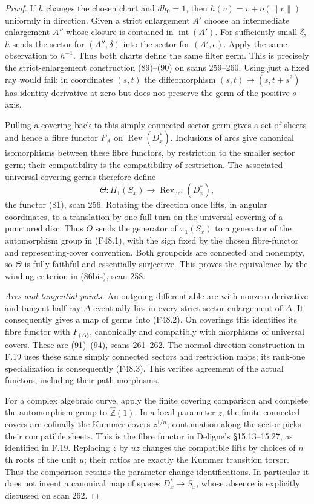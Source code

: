 \begin{proof}
If $h$ changes the chosen chart and $d h_0=1$, then
$h(v)=v+o(\lVert v\rVert)$ uniformly in direction. Given a strict
enlargement $A'$ choose an intermediate enlargement $A''$ whose closure
is contained in $\operatorname{int}(A')$. For sufficiently small $\delta$,
$h$ sends the sector for $(A'',\delta)$ into the sector for
$(A',\epsilon)$. Apply the same observation to $h^{-1}$.
Thus both charts define the same filter germ. This is precisely the
strict-enlargement construction (89)--(90) on scans 259--260.
Using just a fixed ray would fail: in coordinates $(s,t)$ the
diffeomorphism $(s,t)\mapsto(s,t+s^2)$ has identity derivative at zero
but does not preserve the germ of the positive $s$-axis.

Pulling a covering back to this simply connected sector germ gives a
set of sheets and hence a fibre functor $F_A$ on
$\operatorname{Rev}(D_x^*)$. Inclusions of arcs give canonical
isomorphisms between these fibre functors, by restriction to the
smaller sector germ; their compatibility is the compatibility of
restriction. The associated universal covering germs therefore define
\[
 \Theta:\Pi_1(S_x)\longrightarrow
              \operatorname{Rev}_{\mathrm{uni}}(D_x^*),
 \tag{F48.3}
\]
the functor (81), scan 256. Rotating the direction once lifts, in
angular coordinates, to a translation by one full turn on the
universal covering of a punctured disc. Thus $\Theta$ sends the
generator of $\pi_1(S_x)$ to a generator of the automorphism group
in (F48.1), with the sign fixed by the chosen fibre-functor and
representing-cover convention. Both groupoids are connected and nonempty, so $\Theta$ is
fully faithful and essentially surjective. This proves the
equivalence by the winding criterion in (86bis), scan 258.

\emph{Arcs and tangential points.}
An outgoing differentiable arc with nonzero derivative and tangent
half-ray $\Delta$ eventually lies in every strict sector enlargement
of $\Delta$. It consequently gives a map of germs into (F48.2).
On coverings this identifies its fibre functor with $F_{\{\Delta\}}$,
canonically and compatibly with morphisms of universal covers. These
are (91)--(94), scans 261--262. The normal-direction construction in
F.19 uses these same simply connected sectors and restriction maps;
its rank-one specialization is consequently (F48.3). This verifies
agreement of the actual functors, including their path morphisms.

For a complex algebraic curve, apply the finite covering comparison
and complete the automorphism group to $\widehat{\mathbb Z}(1)$.
In a local parameter $z$, the finite connected covers are cofinally
the Kummer covers $z^{1/n}$; continuation along the sector picks their
compatible sheets. This is the fibre functor in Deligne's
\S15.13--15.27, as identified in F.19. Replacing $z$ by $u z$ changes
the compatible lifts by choices of $n$th roots of the unit $u$;
their ratios are exactly the Kummer transition torsor. Thus the
comparison retains the parameter-change identifications. In
particular it does not invent a canonical map of spaces
$D_x^*\to S_x$, whose absence is explicitly discussed on scan 262.


\end{proof}
